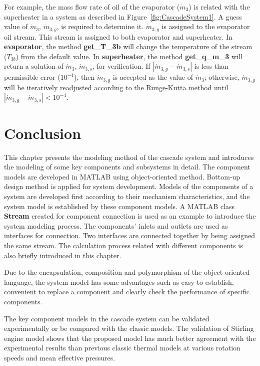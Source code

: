 For example, the mass flow rate of oil of the evaporator ($\dot{m}_3$) is related with the superheater in a system as described in Figure~\ref{fig:CascadeSystem1}.
A guess value of $\dot{m}_3$, $\dot{m}_{3,g}$, is required to determine it. $\dot{m}_{3,g}$ is assigned to the evaporator oil stream. This stream is assigned to both evaporator and superheater. In \textbf{evaporator}, the method \textbf{get\_T\_3b} will change the temperature of the stream ($T_{3b}$) from the default value. 
In \textbf{superheater}, the method \textbf{get\_q\_m\_3} will return a solution of $\dot{m}_3$, $\dot{m}_{3,s}$, for verification. If $\left|\dot{m}_{3,g} - \dot{m}_{3,s}\right|$ is less than permissible error ($10^{-4}$), then $\dot{m}_{3,g}$ is accepted as the value of $\dot{m}_{3}$; otherwise, $\dot{m}_{3,g}$ will be iteratively readjusted according to the Runge-Kutta method until $\left|\dot{m}_{3,g} - \dot{m}_{3,s}\right| < 10^{-4}$.

\section{Conclusion}

This chapter presents the modeling method of the cascade system and introduces the modeling of some key components and subsystems in detail. The component models are developed in MATLAB using object-oriented method. Bottom-up design method is applied for system development. Models of the components of a system are developed first according to their mechanism characteristics, and the system model is established by these component models. A MATLAB class \textbf{Stream} created for component connection is used as an example to introduce the system modeling process. The components' inlets and outlets are used as interfaces for connection. 
Two interfaces are connected together by being assigned the same stream.
The calculation process related with different components is also briefly introduced in this chapter.

Due to the encapsulation, composition and polymorphism of the object-oriented language, the system model has some advantages such as easy to establish, convenient to replace a component and clearly check the performance of specific components.

The key component models in the cascade system can be validated experimentally or be compared with the classic models. The validation of Stirling engine model shows that the proposed model has much better agreement with the experimental results than previous classic thermal models at various rotation speeds and mean effective pressures.
